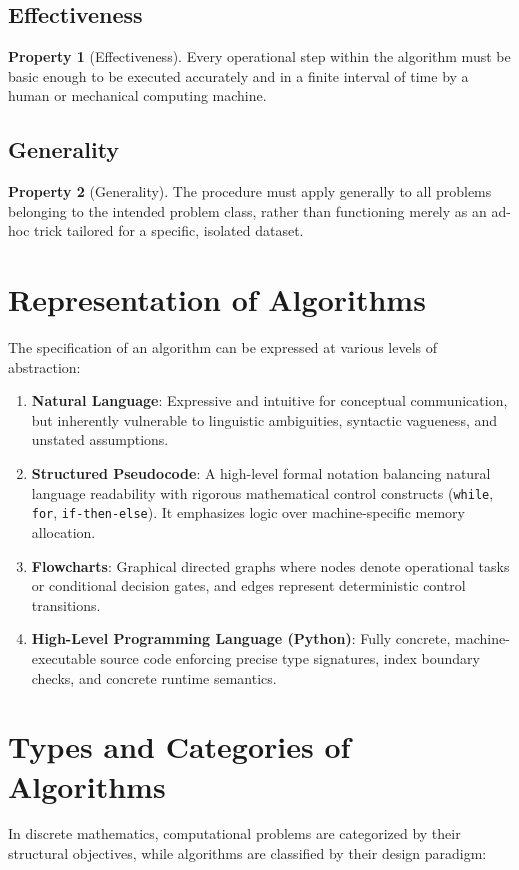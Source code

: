 \documentclass[11pt,a4paper,oneside]{report}
\theoremstyle{definition}
\newtheorem{property}{Property}[chapter]
\begin{document}
\subsection{Effectiveness}
\begin{property}[Effectiveness]
Every operational step within the algorithm must be basic enough to be executed accurately and in a finite interval of time by a human or mechanical computing machine.
\end{property}

\subsection{Generality}
\begin{property}[Generality]
The procedure must apply generally to all problems belonging to the intended problem class, rather than functioning merely as an ad-hoc trick tailored for a specific, isolated dataset.
\end{property}

\section{Representation of Algorithms}
The specification of an algorithm can be expressed at various levels of abstraction:
\begin{enumerate}
    \item \textbf{Natural Language}: Expressive and intuitive for conceptual communication, but inherently vulnerable to linguistic ambiguities, syntactic vagueness, and unstated assumptions.
    \item \textbf{Structured Pseudocode}: A high-level formal notation balancing natural language readability with rigorous mathematical control constructs (\texttt{while}, \texttt{for}, \texttt{if-then-else}). It emphasizes logic over machine-specific memory allocation.
    \item \textbf{Flowcharts}: Graphical directed graphs where nodes denote operational tasks or conditional decision gates, and edges represent deterministic control transitions.
    \item \textbf{High-Level Programming Language (Python)}: Fully concrete, machine-executable source code enforcing precise type signatures, index boundary checks, and concrete runtime semantics.
\end{enumerate}

\section{Types and Categories of Algorithms}
In discrete mathematics, computational problems are categorized by their structural objectives, while algorithms are classified by their design paradigm:
\end{document}
